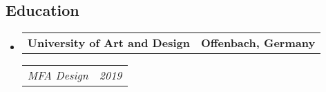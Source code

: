 \documentclass[11pt,letterpaper]{article}
\makeatletter
\newcommand{\headerrow}[2]
{\begin{tabular*}{\linewidth}{l@{\extracolsep{\fill}}r}
#1 &
#2 \\
\end{tabular*}}
\makeatother
\begin{document}
\subsection*{\Large Education}

\begin{itemize}[leftmargin=1em]
	\parskip=0.1em
		
	\item
	      \headerrow
	      {\textbf{University of Art and Design}}
	      {\textbf{Offenbach, Germany}}
	      \headerrow
	      {\emph{MFA Design}}
	      {\emph{2019}}
	      
	      	      
\end{itemize}
\end{document}
